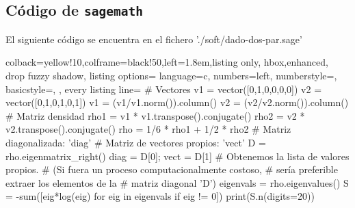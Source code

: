 %
%    
%
%
%
% 

\subsection{Código de \texttt{sagemath}}
\label{subsect:apcua-estadomezcla-dado-sagemath}
El siguiente código se encuentra en el fichero './soft/dado-dos-par.sage'
\begin{tcblisting}{%
   colback=yellow!10,colframe=black!50,left=1.8em,listing only,
   hbox,enhanced, drop fuzzy shadow,
   listing options={%
     language=c,
     numbers=left,
     numberstyle=\scriptsize\color{red!50},
     basicstyle=\footnotesize,
   },
   every listing line={\ttfamily}
 }
 # Vectores
 v1 = vector([0,1,0,0,0,0])
 v2 = vector([0,1,0,1,0,1])
 v1 = (v1/v1.norm()).column()
 v2 = (v2/v2.norm()).column()
 # Matriz densidad
 rho1 = v1 * v1.transpose().conjugate()
 rho2 = v2 * v2.transpose().conjugate()
 rho = 1/6 * rho1 + 1/2 * rho2
 # Matriz diagonalizada: 'diag'
 # Matriz de vectores propios: 'vect'
 D = rho.eigenmatrix_right()
 diag = D[0]; vect = D[1]
 # Obtenemos la lista de valores propios.
 # (Si fuera un proceso computacionalmente costoso,
 # sería preferible extraer los elementos de la
 # matriz diagonal 'D')
 eigenvals = rho.eigenvalues()
 S = -sum([eig*log(eig) for eig in eigenvals if eig != 0])
 print(S.n(digits=20))
\end{tcblisting}


